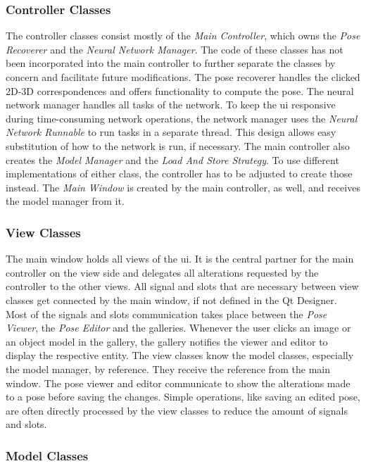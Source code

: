 \subsubsection{Controller Classes}

The controller classes consist mostly of the \textit{Main Controller}, which owns the \textit{Pose Recoverer} and the \textit{Neural Network Manager}. The code of these classes has not been incorporated into the main controller to further separate the classes by concern and facilitate future modifications. The pose recoverer handles the clicked 2D-3D correspondences and offers functionality to compute the pose. The neural network manager handles all tasks of the network. To keep the \ac{ui} responsive during time-consuming network operations, the network manager uses the \textit{Neural Network Runnable} to run tasks in a separate thread. This design allows easy substitution of how to the network is run, if necessary. The main controller also creates the \textit{Model Manager} and the \textit{Load And Store Strategy}. To use different implementations of either class, the controller has to be adjusted to create those instead. The \textit{Main Window} is created by the main controller, as well, and receives the model manager from it.

\subsubsection{View Classes}

The main window holds all views of the \ac{ui}. It is the central partner for the main controller on the view side and delegates all alterations requested by the controller to the other views. All signal and slots that are necessary between view classes get connected by the main window, if not defined in the Qt Designer. Most of the signals and slots communication takes place between the \textit{Pose Viewer}, the \textit{Pose Editor} and the galleries. Whenever the user clicks an image or an object model in the gallery, the gallery notifies the viewer and editor to display the respective entity. The view classes know the model classes, especially the model manager, by reference. They receive the reference from the main window. The pose viewer and editor communicate to show the alterations made to a pose before saving the changes. Simple operations, like saving an edited pose, are often directly processed by the view classes to reduce the amount of signals and slots.

\subsubsection{Model Classes}

